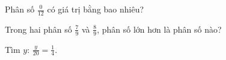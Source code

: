 \begin{ex}
Phân số $\frac{0}{12}$ có giá trị bằng bao nhiêu?
\end{ex}

\begin{ex}
Trong hai phân số $\frac{7}{9}$ và $\frac{8}{9}$, phân số lớn hơn là phân số nào?
\end{ex}

\begin{ex}
Tìm $y$: $\frac{y}{20} = \frac{1}{4}$.
\end{ex}
